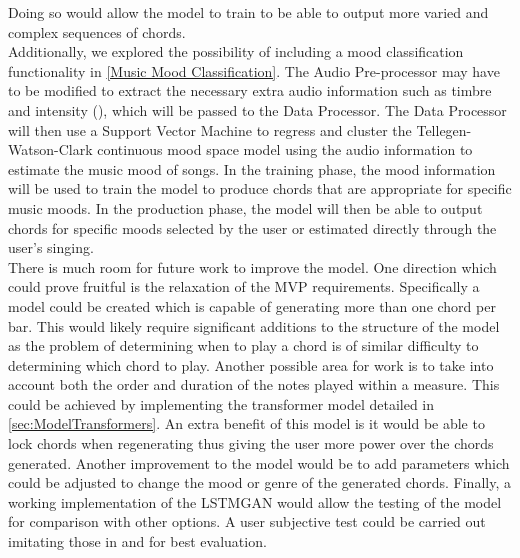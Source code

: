 Doing so would allow the model to train to be able to output more varied and complex sequences of chords.
\\
Additionally, we explored the possibility of including a mood classification functionality in \cref{Music Mood Classification}. 
The Audio Pre-processor may have to be modified to extract the necessary extra audio information such as timbre and intensity (\cite{Timbre}), which will be passed to the Data Processor. The Data Processor will then use a Support Vector Machine to regress and cluster the Tellegen-Watson-Clark continuous mood space model using the audio information to estimate the music mood of songs. 
In the training phase, the mood information will be used to train the model to produce chords that are appropriate for specific music moods. 
In the production phase, the model will then be able to output chords for specific moods selected by the user or estimated directly through the user's singing.
\\
There is much room for future work to improve the model.
One direction which could prove fruitful is the relaxation of the MVP requirements. 
Specifically a model could be created which is capable of generating more than one chord per bar.
This would likely require significant additions to the structure of the model as the problem of determining when to play a chord is of similar difficulty to determining which chord to play.
Another possible area for work is to take into account both the order and duration of the notes played within a measure.
This could be achieved by implementing the transformer model detailed in \cref{sec:ModelTransformers}.
An extra benefit of this model is it would be able to lock chords when regenerating thus giving the user more power over the chords generated.
Another improvement to the model would be to add parameters which could be adjusted to change the mood or genre of the generated chords.
Finally, a working implementation of the LSTMGAN would allow the testing of the model for comparison with other options.
A user subjective test could be carried out imitating those in \cite{MySong} and \cite{BLSTM} for best evaluation.
\\

